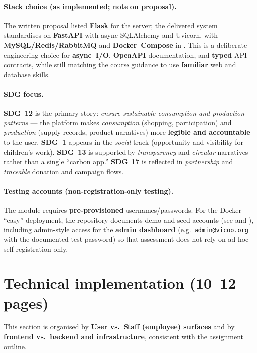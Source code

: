 \documentclass[11pt,a4paper]{article}
\begin{document}
\paragraph{Stack choice (as implemented; note on proposal).}
The written proposal listed \textbf{Flask} for the server; the delivered system standardises on \textbf{FastAPI} with async SQLAlchemy and Uvicorn, with \textbf{MySQL/Redis/RabbitMQ} and \textbf{Docker~Compose} in . This is a deliberate engineering choice for \textbf{async~I/O}, \textbf{OpenAPI} documentation, and \textbf{typed} API contracts, while still matching the course guidance to use \textbf{familiar} web and database skills.

\paragraph{SDG focus.}
\textbf{SDG~12} is the primary story: \emph{ensure sustainable consumption and production patterns} --- the platform makes \emph{consumption} (shopping, participation) and \emph{production} (supply records, product narratives) more \textbf{legible and accountable} to the user. \textbf{SDG~1} appears in the \emph{social} track (opportunity and visibility for children's work). \textbf{SDG~13} is supported by \emph{transparency} and \emph{circular} narratives rather than a single ``carbon app.'' \textbf{SDG~17} is reflected in \emph{partnership} and \emph{traceable} donation and campaign flows.

\paragraph{Testing accounts (non-registration-only testing).}
The module requires \textbf{pre-provisioned} usernames/passwords. For the Docker ``easy'' deployment, the repository documents demo and seed accounts (see  and ), including admin-style access for the \textbf{admin dashboard} (e.g.\ \texttt{admin@vicoo.org} with the documented test password) so that assessment does not rely on ad-hoc self-registration only.

\section{Technical implementation (10--12 pages)}

This section is organised by \textbf{User vs.\ Staff (employee) surfaces} and by \textbf{frontend vs.\ backend and infrastructure}, consistent with the assignment outline.
\end{document}
